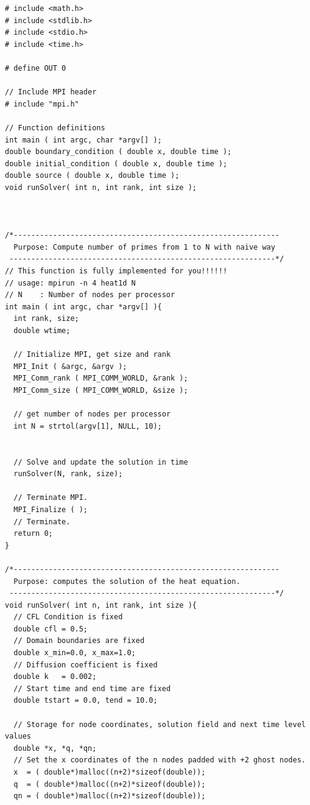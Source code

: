 \documentclass{article}
\begin{document}
\begin{verbatim}
# include <math.h>
# include <stdlib.h>
# include <stdio.h>
# include <time.h>

# define OUT 0

// Include MPI header
# include "mpi.h"

// Function definitions
int main ( int argc, char *argv[] );
double boundary_condition ( double x, double time );
double initial_condition ( double x, double time );
double source ( double x, double time );
void runSolver( int n, int rank, int size );



/*-------------------------------------------------------------
  Purpose: Compute number of primes from 1 to N with naive way
 -------------------------------------------------------------*/
// This function is fully implemented for you!!!!!!
// usage: mpirun -n 4 heat1d N
// N    : Number of nodes per processor
int main ( int argc, char *argv[] ){
  int rank, size;
  double wtime;

  // Initialize MPI, get size and rank
  MPI_Init ( &argc, &argv );
  MPI_Comm_rank ( MPI_COMM_WORLD, &rank );
  MPI_Comm_size ( MPI_COMM_WORLD, &size );

  // get number of nodes per processor
  int N = strtol(argv[1], NULL, 10);


  // Solve and update the solution in time
  runSolver(N, rank, size);

  // Terminate MPI.
  MPI_Finalize ( );
  // Terminate.
  return 0;
}

/*-------------------------------------------------------------
  Purpose: computes the solution of the heat equation.
 -------------------------------------------------------------*/
void runSolver( int n, int rank, int size ){
  // CFL Condition is fixed
  double cfl = 0.5; 
  // Domain boundaries are fixed
  double x_min=0.0, x_max=1.0;
  // Diffusion coefficient is fixed
  double k   = 0.002;
  // Start time and end time are fixed
  double tstart = 0.0, tend = 10.0;  

  // Storage for node coordinates, solution field and next time level values
  double *x, *q, *qn;
  // Set the x coordinates of the n nodes padded with +2 ghost nodes. 
  x  = ( double*)malloc((n+2)*sizeof(double));
  q  = ( double*)malloc((n+2)*sizeof(double));
  qn = ( double*)malloc((n+2)*sizeof(double));


\end{verbatim}
\end{document}
